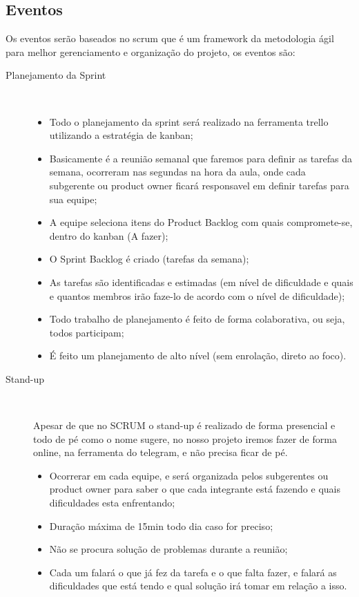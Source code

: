 \subsection{Eventos}

  Os eventos serão baseados no scrum que é um framework da metodologia ágil para melhor gerenciamento e organização do projeto, os
  eventos são:

  \begin{description}
    \item[Planejamento da Sprint] \
      \begin{itemize}
        \item Todo o planejamento da sprint será realizado na ferramenta trello utilizando a estratégia de kanban;
        \item Basicamente é a reunião semanal que faremos para definir as tarefas da semana, ocorreram nas segundas na hora da aula,
          onde cada subgerente ou product owner ficará responsavel em definir tarefas para sua equipe;
        \item A equipe seleciona itens do Product Backlog com quais compromete-se, dentro do kanban (A fazer);
        \item O Sprint Backlog é criado (tarefas da semana);
        \item As tarefas são identificadas e estimadas (em nível de dificuldade e quais e quantos membros irão faze-lo de acordo com o
          nível de dificuldade);
        \item Todo trabalho de planejamento é feito de forma colaborativa, ou seja, todos participam;
        \item É feito um planejamento de alto nível (sem enrolação, direto ao foco).
      \end{itemize}
    \item[Stand-up] \

      Apesar de que no SCRUM o stand-up é realizado de forma presencial e todo de pé como o nome sugere, no nosso projeto iremos fazer
      de forma online, na ferramenta do telegram, e não precisa ficar de pé.

      \begin{itemize}
        \item Ocorrerar em cada equipe, e será organizada pelos subgerentes ou product owner para saber o que cada integrante está
          fazendo e quais dificuldades esta enfrentando;
        \item Duração máxima de 15min todo dia caso for preciso;
        \item Não se procura solução de problemas durante a reunião;
        \item Cada um falará o que já fez da tarefa e o que falta fazer, e falará as dificuldades que está tendo e qual solução irá
          tomar em relação a isso.
      \end{itemize}


\end{description}

